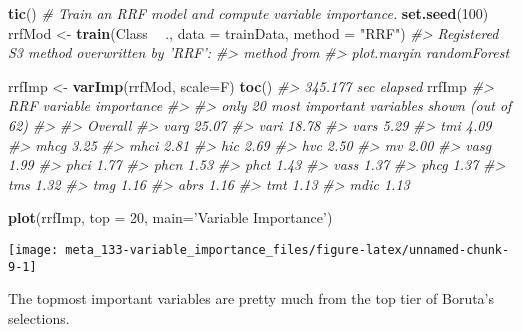 \documentclass[]{book}
\newenvironment{Shaded}{\begin{snugshade}}{\end{snugshade}}
\newcommand{\CommentTok}[1]{\textcolor[rgb]{0.56,0.35,0.01}{\textit{#1}}}
\newcommand{\DataTypeTok}[1]{\textcolor[rgb]{0.13,0.29,0.53}{#1}}
\newcommand{\DecValTok}[1]{\textcolor[rgb]{0.00,0.00,0.81}{#1}}
\newcommand{\KeywordTok}[1]{\textcolor[rgb]{0.13,0.29,0.53}{\textbf{#1}}}
\newcommand{\NormalTok}[1]{#1}
\newcommand{\OperatorTok}[1]{\textcolor[rgb]{0.81,0.36,0.00}{\textbf{#1}}}
\newcommand{\StringTok}[1]{\textcolor[rgb]{0.31,0.60,0.02}{#1}}
\begin{document}
\begin{Shaded}
\begin{Highlighting}[]
\KeywordTok{tic}\NormalTok{()}
\CommentTok{# Train an RRF model and compute variable importance.}
\KeywordTok{set.seed}\NormalTok{(}\DecValTok{100}\NormalTok{)}
\NormalTok{rrfMod <-}\StringTok{ }\KeywordTok{train}\NormalTok{(Class }\OperatorTok{~}\StringTok{ }\NormalTok{., }
                \DataTypeTok{data =}\NormalTok{ trainData, }
                \DataTypeTok{method =} \StringTok{"RRF"}\NormalTok{)}
\CommentTok{#> Registered S3 method overwritten by 'RRF':}
\CommentTok{#>   method      from        }
\CommentTok{#>   plot.margin randomForest}

\NormalTok{rrfImp <-}\StringTok{ }\KeywordTok{varImp}\NormalTok{(rrfMod, }\DataTypeTok{scale=}\NormalTok{F)}
\KeywordTok{toc}\NormalTok{()}
\CommentTok{#> 345.177 sec elapsed}
\NormalTok{rrfImp}
\CommentTok{#> RRF variable importance}
\CommentTok{#> }
\CommentTok{#>   only 20 most important variables shown (out of 62)}
\CommentTok{#> }
\CommentTok{#>      Overall}
\CommentTok{#> varg   25.07}
\CommentTok{#> vari   18.78}
\CommentTok{#> vars    5.29}
\CommentTok{#> tmi     4.09}
\CommentTok{#> mhcg    3.25}
\CommentTok{#> mhci    2.81}
\CommentTok{#> hic     2.69}
\CommentTok{#> hvc     2.50}
\CommentTok{#> mv      2.00}
\CommentTok{#> vasg    1.99}
\CommentTok{#> phci    1.77}
\CommentTok{#> phcn    1.53}
\CommentTok{#> phct    1.43}
\CommentTok{#> vass    1.37}
\CommentTok{#> phcg    1.37}
\CommentTok{#> tms     1.32}
\CommentTok{#> tmg     1.16}
\CommentTok{#> abrs    1.16}
\CommentTok{#> tmt     1.13}
\CommentTok{#> mdic    1.13}
\end{Highlighting}
\end{Shaded}

\begin{Shaded}
\begin{Highlighting}[]
\KeywordTok{plot}\NormalTok{(rrfImp, }\DataTypeTok{top =} \DecValTok{20}\NormalTok{, }\DataTypeTok{main=}\StringTok{'Variable Importance'}\NormalTok{)}
\end{Highlighting}
\end{Shaded}

\begin{center}\texttt{[image: meta\_133-variable\_importance\_files/figure-latex/unnamed-chunk-9-1]} \end{center}

The topmost important variables are pretty much from the top tier of Boruta's selections.
\end{document}
